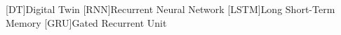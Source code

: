 \begin{acronym}
    [DT]{Digital Twin}
    [RNN]{Recurrent Neural Network}
    [LSTM]{Long Short-Term Memory}
    [GRU]{Gated Recurrent Unit}
\end{acronym}
